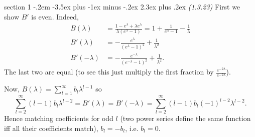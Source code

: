 \documentclass[12pt]{article}
\makeatletter
\theoremstyle{norm}
\newcommand{\rc}[1]{\frac{1}{#1}}
\newcommand{\la}[0]{\lambda}
\newenvironment{problem}{\@startsection
       {section}
       {1}
       {-.2em}
       {-3.5ex plus -1ex minus -.2ex}
       {2.3ex plus .2ex}
       {\pagebreak[3]%
       \large\bf\noindent{Problem }
       }
       }
       {%
       }
\makeatother
\begin{document}
\begin{problem}{\it(1.3.23)}
First we show $B'$ is even. Indeed,
\begin{align*}
B(\la)&=\frac{1-e^{\la}+\la e^{\la}}{\la(e^{\la}-1)}=1+\rc{e^{\la}-1}-\rc{\la}\\
B'(\la)&=-\frac{e^{\la}}{(e^{\la}-1)^2}+\rc{\la^2}\\
B'(-\la)&=-\frac{e^{-\la}}{(e^{-\la}-1)^2}+\rc{\la^2}.
\end{align*}
The last two are equal (to see this just multiply the first fraction by $\frac{e^{-2\la}}{e^{-2\la}}$).

Now, $B(\la)=\sum_{l=1}^{\infty} b_l\la^{l-1} $ so
\[
\sum_{l=2}^{\infty} (l-1)b_{l}\la^{l-2}=
B'(\la)=B'(-\la)=\sum_{l=2}^{\infty} (l-1)b_{l}(-1)^{l-2}\la^{l-2}.
\]
Hence matching coefficients for odd $l$ (two power series define the same function iff all their coefficients match), $b_l=-b_l$, i.e. $b_l=0$.
\end{problem}
\end{document}
